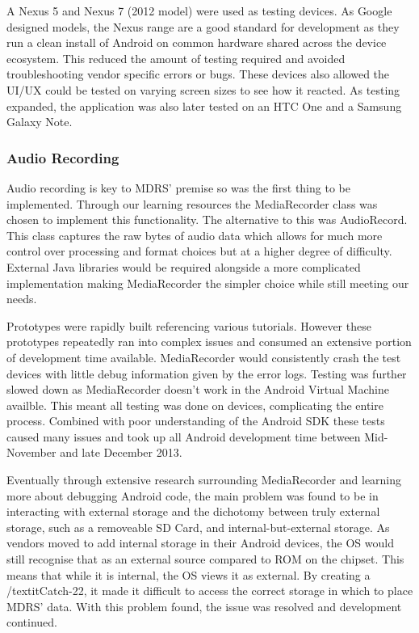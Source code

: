 \documentclass{l3proj}
\begin{document}
A Nexus 5 and Nexus 7 (2012 model) were used as testing devices. As Google designed models, the Nexus range are a good standard for development as they run a clean install of Android on common hardware shared across the device ecosystem. This reduced the amount of testing required and avoided troubleshooting vendor specific errors or bugs. These devices also allowed the UI/UX could be tested on varying screen sizes to see how it reacted. As testing expanded, the application was also later tested on an HTC One and a Samsung Galaxy Note.

\subsubsection{Audio Recording}    Audio recording is key to MDRS' premise so was the first thing to be implemented. Through our learning resources the MediaRecorder class was chosen to implement this functionality. The alternative to this was AudioRecord. This class captures the raw bytes of audio data which allows for much more control over processing and format choices but at a higher degree of difficulty. External Java libraries would be required alongside a more complicated implementation making MediaRecorder the simpler choice while still meeting our needs.

Prototypes were rapidly built referencing various tutorials. However these prototypes repeatedly ran into complex issues and consumed an extensive portion of development time available. MediaRecorder would consistently crash the test devices with little debug information given by the error logs. Testing was further slowed down as MediaRecorder doesn't work in the Android Virtual Machine availble. This meant all testing was done on devices, complicating the entire process. Combined with poor understanding of the Android SDK these tests caused many issues and took up all Android development time between Mid-November and late December 2013.

Eventually through extensive research surrounding MediaRecorder and learning more about debugging Android code, the main problem was found to be in interacting with external storage and the dichotomy between truly external storage, such as a removeable SD Card, and internal-but-external storage. As vendors moved to add internal storage in their Android devices, the OS would still recognise that as an external source compared to ROM on the chipset. This means that while it is internal, the OS views it as external. By creating a /textit{Catch-22}, it made it difficult to access the correct storage in which to place MDRS' data. With this problem found, the issue was resolved and development continued.
\end{document}
